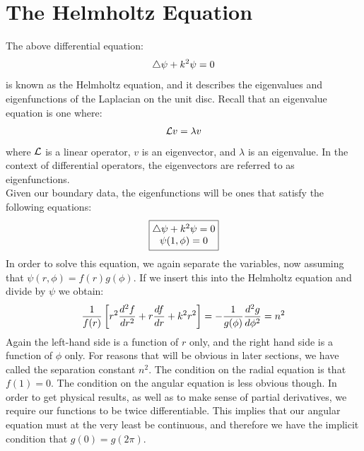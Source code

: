 \documentclass{article}
\begin{document}
\section{The Helmholtz Equation}
The above differential equation:
\begin{equation}
  \bigtriangleup \psi+k^2\psi=0
\end{equation}
is known as the Helmholtz equation, and it describes the eigenvalues and eigenfunctions of the Laplacian on the unit disc. Recall that an eigenvalue equation is one where:
\begin{equation}
  \mathcal{L}v = \lambda v
\end{equation}
where $\mathcal{L}$ is a linear operator, $v$ is an eigenvector, and $\lambda$ is an eigenvalue. In the context of differential operators, the eigenvectors are referred to as eigenfunctions.\\
Given our boundary data, the eigenfunctions will be ones that satisfy the following equations:
\begin{equation}
  \boxed{
    \begin{matrix}
      \bigtriangleup \psi+k^2\psi=0 \\ 
      \psi(1,\phi) = 0
    \end{matrix}
  }
\end{equation}
In order to solve this equation, we again separate the variables, now assuming that $\psi(r,\phi)=f(r)g(\phi)$. If we insert this into the Helmholtz equation and divide by $\psi$ we obtain:
\begin{equation}
  \frac{1}{f(r)}\left[r^2 \frac{d ^2 f}{d r^2} + r \frac{d f}{d r}+k^2 r^2\right] = -\frac{1}{g(\phi)}\frac{d ^2 g}{d \phi^2} = n^2
\end{equation}
Again the left-hand side is a function of $r$ only, and the right hand side is a function of $\phi$ only. For reasons that will be obvious in later sections, we have called the separation constant $n^2$. The condition on the radial equation is that $f(1) = 0$. The condition on the angular equation is less obvious though. In order to get physical results, as well as to make sense of partial derivatives, we require our functions to be twice differentiable. This implies that our angular equation must at the very least be continuous, and therefore we have the implicit condition that $g(0)=g(2\pi)$.
\end{document}
